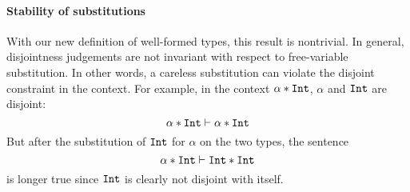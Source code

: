 \paragraph{Stability of substitutions}
With our new definition of well-formed types, this result is nontrivial.
In general, disjointness judgements are not invariant with respect to
free-variable substitution. In other words, a careless substitution can violate
the disjoint constraint in the context. For example, in the context $\alpha
* \texttt{Int}$, $\alpha$ and $\texttt{Int}$ are disjoint:
\[ \alpha * \texttt{Int} \vdash \alpha * \texttt{Int} \]
But after the substitution of $\texttt{Int}$ for $\alpha$ on the two types, the sentence
\[ \alpha * \texttt{Int} \vdash \texttt{Int} * \texttt{Int} \]
is longer true since $\texttt{Int}$ is clearly not disjoint with itself.
